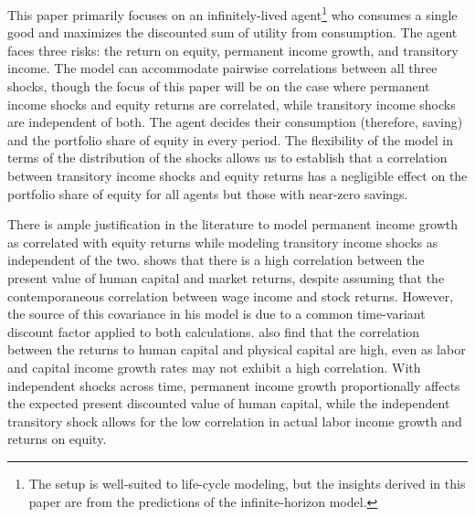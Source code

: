 This paper primarily focuses on an infinitely-lived agent\footnote{The setup is well-suited to life-cycle modeling, but the insights derived in this paper are from the predictions of the infinite-horizon model.} who consumes a single good and maximizes the discounted sum of utility from consumption. The agent faces three risks: the return on equity, permanent income growth, and transitory income. The model can accommodate pairwise correlations between all three shocks, though the focus of this paper will be on the case where permanent income shocks and equity returns are correlated, while transitory income shocks are independent of both. The agent decides their consumption (therefore, saving) and the portfolio share of equity in every period. The flexibility of the model in terms of the distribution of the shocks allows us to establish that a correlation between transitory income shocks and equity returns has a negligible effect on the portfolio share of equity for all agents but those with near-zero savings.

There is ample justification in the literature to model permanent income growth as correlated with equity returns while modeling transitory income shocks as independent of the two. \citet{Campbell1996} shows that there is a high correlation between the present value of human capital and market returns, despite assuming that the contemporaneous correlation between wage income and stock returns. However, the source of this covariance in his model is due to a common time-variant discount factor applied to both calculations. \citet{Baxter1997} also find that the correlation between the returns to human capital and physical capital are high, even as labor and capital income growth rates may not exhibit a high correlation. With independent shocks across time, permanent income growth proportionally affects the expected present discounted value of human capital, while the independent transitory shock allows for the low correlation in actual labor income growth and returns on equity.

